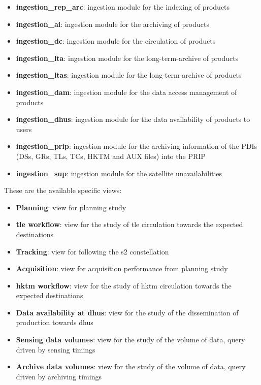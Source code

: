 \begin{itemize}
\item \textbf{ingestion\_rep\_arc}: ingestion module for the indexing of products

\item \textbf{ingestion\_ai}: ingestion module for the archiving of products

\item \textbf{ingestion\_dc}: ingestion module for the circulation of products

\item \textbf{ingestion\_lta}: ingestion module for the long-term-archive of products

\item \textbf{ingestion\_ltas}: ingestion module for the long-term-archive of products

\item \textbf{ingestion\_dam}: ingestion module for the data access management of products

\item \textbf{ingestion\_dhus}: ingestion module for the data availability of products to users

\item \textbf{ingestion\_prip}: ingestion module for the archiving information of the PDIs (DSs, GRs, TLs, TCs, HKTM and AUX files) into the PRIP

\item \textbf{ingestion\_sup}: ingestion module for the satellite unavailabilities

\end{itemize}

These are the available specific views:

\begin{itemize} 

\item \textbf{Planning}: view for planning study

\item \textbf{\acrshort{tle} workflow}: view for the study of \acrshort{tle} circulation towards the expected destinations

\item \textbf{Tracking}: view for following the \acrshort{s2} constellation
  
\item \textbf{Acquisition}: view for acquisition performance from planning study

\item \textbf{\acrshort{hktm} workflow}: view for the study of \acrshort{hktm} circulation towards the expected destinations

\item \textbf{Data availability at \acrshort{dhus}}: view for the study of the dissemination of production towards \acrshort{dhus}

\item \textbf{Sensing data volumes}: view for the study of the volume of data, query driven by sensing timings

\item \textbf{Archive data volumes}: view for the study of the volume of data, query driven by archiving timings
  
\end{itemize}
